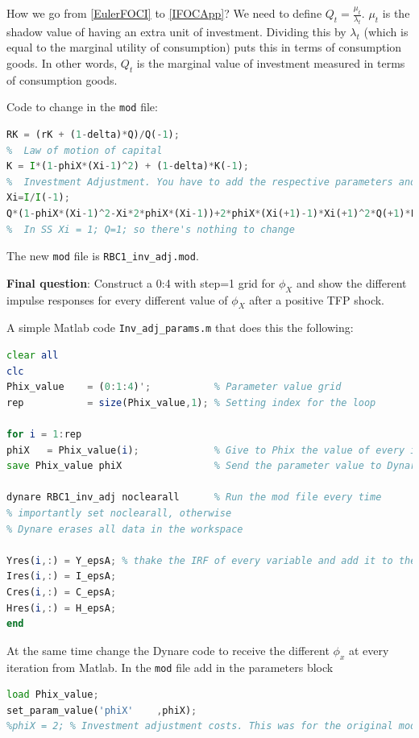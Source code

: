 \documentclass[thmsa,11pt,a4paper]{article}
\theoremstyle{definition}
\begin{document}
How we go from \eqref{EulerFOCI} to \eqref{IFOCApp}? We need to define $Q_t = \frac{\mu_t}{\lambda_t}$. $\mu_t$ is the shadow value of having an extra 
unit of investment. Dividing this by $\lambda_t$ (which is equal to the marginal utility of consumption) puts this in terms of consumption goods. In other words, $Q_t$ is the marginal value of investment measured in terms of consumption goods.

Code to change in the \texttt{mod} file:

\begin{lstlisting}[language=Octave]
% Gross rate becomes
RK = (rK + (1-delta)*Q)/Q(-1);
%  Law of motion of capital
K = I*(1-phiX*(Xi-1)^2) + (1-delta)*K(-1);
%  Investment Adjustment. You have to add the respective parameters and variables
Xi=I/I(-1);
Q*(1-phiX*(Xi-1)^2-Xi*2*phiX*(Xi-1))+2*phiX*(Xi(+1)-1)*Xi(+1)^2*Q(+1)*LAMBDA(+1)=1;
%  In SS Xi = 1; Q=1; so there's nothing to change
\end{lstlisting} 

The new \texttt{mod} file is \texttt{RBC1\_inv\_adj.mod}.

\textbf{Final question}: Construct a 0:4 with step=1 grid  for $\phi_X$ and show the different impulse responses for every different value of $\phi_X$ after a positive TFP shock.

A simple Matlab code \texttt{Inv\_adj\_params.m} that does  this the following:
\begin{lstlisting}[language=Octave]
clear all
clc
Phix_value    = (0:1:4)';           % Parameter value grid
rep           = size(Phix_value,1); % Setting index for the loop

for i = 1:rep
phiX   = Phix_value(i);             % Give to Phix the value of every iteration
save Phix_value phiX                % Send the parameter value to Dynare Phix_value 

dynare RBC1_inv_adj noclearall      % Run the mod file every time
% importantly set noclearall, otherwise 
% Dynare erases all data in the workspace

Yres(i,:) = Y_epsA; % thake the IRF of every variable and add it to the new 40xrep matrix
Ires(i,:) = I_epsA;
Cres(i,:) = C_epsA;
Hres(i,:) = H_epsA;
end
\end{lstlisting}

At the same time change the Dynare code to receive the different $\phi_x$ at every iteration from Matlab. 
In the \texttt{mod} file add in the parameters block

\begin{lstlisting}[language=Octave]
load Phix_value;
set_param_value('phiX'    ,phiX); 
%phiX = 2; % Investment adjustment costs. This was for the original model
\end{lstlisting}
\end{document}
